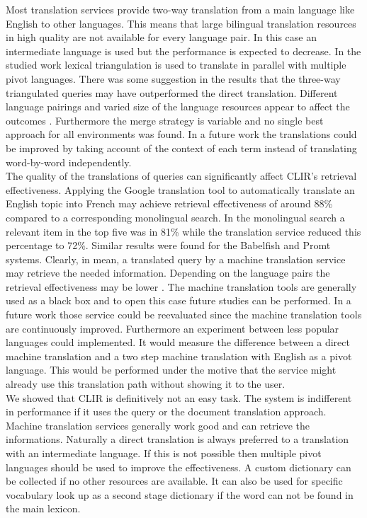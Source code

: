 \documentclass[journal]{IEEEtran}
\begin{document}
Most translation services provide two-way translation from a main language like English to other languages.
This means that large bilingual translation resources in high quality are not available for every language pair.
In this case an intermediate language is used but the performance is expected to decrease.
In the studied work lexical triangulation is used to translate in parallel with multiple pivot languages.
There was some suggestion in the results that the three-way triangulated queries may have outperformed the direct translation.
Different language pairings and varied size of the language resources appear to affect the outcomes \cite{gollins01}.
Furthermore the merge strategy is variable and no single best approach for all environments was found.
In a future work the translations could be improved by taking account of the context of each term instead of translating word-by-word independently.
\mbox{}\\

The quality of the translations of queries can significantly affect CLIR's retrieval effectiveness.
Applying the Google translation tool to automatically translate an English topic into French may achieve retrieval effectiveness of around 88\% compared to a corresponding monolingual search.
In the monolingual search a relevant item in the top five was in 81\% while the translation service reduced this percentage to 72\%.
Similar results were found for the Babelfish and Promt systems.
Clearly, in mean, a translated query by a machine translation service may retrieve the needed information.
Depending on the language pairs the retrieval effectiveness may be lower \cite{savoy09}.
The machine translation tools are generally used as a black box and to open this case future studies can be performed.
In a future work those service could be reevaluated since the machine translation tools are continuously improved.
Furthermore an experiment between less popular languages could implemented.
It would measure the difference between a direct machine translation and a two step machine translation with English as a pivot language.
This would be performed under the motive that the service might already use this translation path without showing it to the user.
\mbox{}\\

We showed that CLIR is definitively not an easy task.
The system is indifferent in performance if it uses the query or the document translation approach.
Machine translation services generally work good and can retrieve the informations.
Naturally a direct translation is always preferred to a translation with an intermediate language.
If this is not possible then multiple pivot languages should be used to improve the effectiveness.
A custom dictionary can be collected if no other resources are available.
It can also be used for specific vocabulary look up as a second stage dictionary if the word can not be found in the main lexicon.
\end{document}
